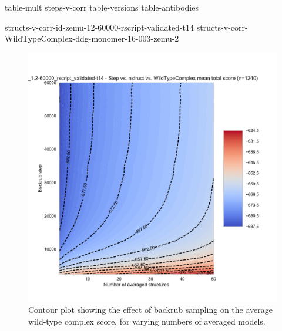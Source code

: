 \documentclass{article}
\begin{document}
\renewcommand{\thefigure}{S\arabic{figure}}
\setcounter{figure}{0}
\renewcommand{\thetable}{S\arabic{table}}
\setcounter{table}{0}
\renewcommand{\lstlistingname}{Supporting Listing}

{table-mult}
{steps-v-corr}
{table-versions}
{table-antibodies}

\clearpage

\clearpage

{structs-v-corr-id-zemu-12-60000-rscript-validated-t14}
{structs-v-corr-WildTypeComplex-ddg-monomer-16-003-zemu-2}

\begin{figure}
  \centering
  \includegraphics[width=\textwidth,keepaspectratio]{figures/wildtypecomplex-scores-complete.pdf}
  \caption{
    Contour plot showing the effect of backrub sampling on the average wild-type complex score, for varying numbers of averaged models.
  } \label{fig:wildtypecomplex-scores-complete}
\end{figure}
\end{document}

